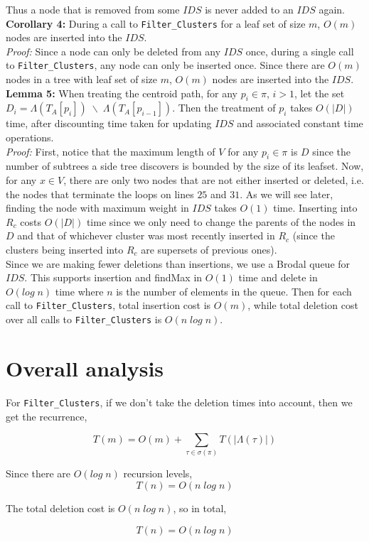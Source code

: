 \documentclass{article}
\begin{document}
    Thus a node that is removed from some $IDS$ is never added to an $IDS$ again.\\

    \textbf{Corollary 4:} During a call to \texttt{Filter\_Clusters} for a leaf set of size $m$, $O(m)$ nodes are inserted into the $IDS$.\\
    \textit{Proof:} Since a node can only be deleted from any $IDS$ once, during a single call to \texttt{Filter\_Clusters}, any node can only be inserted once. Since there are $O(m)$ nodes in a tree with leaf set of size $m$, $O(m)$ nodes are inserted into the $IDS$.\\

    \textbf{Lemma 5:} When treating the centroid path, for any $p_i \in \pi$, $i > 1$, let the set $D_i = \Lambda(T_A[p_i]) \;\backslash\; \Lambda(T_A[p_{i-1}])$. Then the treatment of $p_i$ takes $O(|D|)$ time, after discounting time taken for updating $IDS$ and associated constant time operations.\\
    \textit{Proof:} First, notice that the maximum length of $V$ for any $p_i \in \pi$ is $D$ since the number of subtrees a side tree discovers is bounded by the size of its leafset. Now, for any $x \in V$, there are only two nodes that are not either inserted or deleted, i.e. the nodes that terminate the loops on lines $25$ and $31$. As we will see later, finding the node with maximum weight in $IDS$ takes $O(1)$ time. Inserting into $R_c$ costs $O(|D|)$ time since we only need to change the parents of the nodes in $D$ and that of whichever cluster was most recently inserted in $R_c$ (since the clusters being inserted into $R_c$ are supersets of previous ones).\\

    Since we are making fewer deletions than insertions, we use a Brodal queue for $IDS$. This supports insertion and findMax in $O(1)$ time and delete in $O(log\;n)$ time where $n$ is the number of elements in the queue. Then for each call to \texttt{Filter\_Clusters}, total insertion cost is $O(m)$, while total deletion cost over all calls to \texttt{Filter\_Clusters} is $O(n\;log\;n)$.

    \section{Overall analysis}

    For \texttt{Filter\_Clusters}, if we don't take the deletion times into account, then we get the recurrence,

    \[T(m) = O(m) + \sum_{\tau\in\sigma(\pi)}T(|\Lambda(\tau)|)\]

    Since there are $O(log\;n)$ recursion levels,
    \[T(n) = O(n\;log\;n)\]

    The total deletion cost is $O(n\;log\;n)$, so in total,

    \[T(n) = O(n\;log\;n)\]
\end{document}
